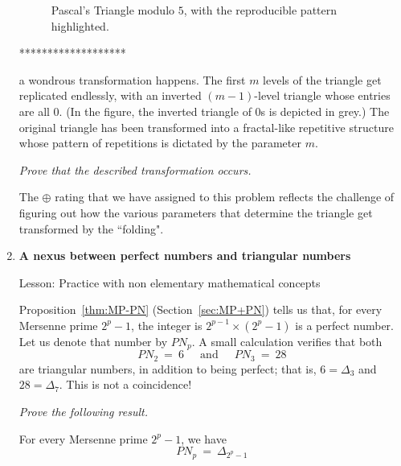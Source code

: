 \begin{enumerate}
{\begin{figure}[ht]
\begin{center}
        \caption{Pascal's Triangle modulo $5$, with the reproducible pattern highlighted.}
        \label{fig:TriangleModulo5shade}
\end{center}
\end{figure}
*******************}
a wondrous transformation happens.  The first $m$ levels of the triangle get replicated endlessly, with an inverted $(m-1)$-level triangle whose entries are all $0$.  (In the figure, the inverted triangle of $0$s is depicted in grey.)  The original triangle has been transformed into a fractal-like repetitive structure whose pattern of repetitions is dictated by the parameter $m$.

\medskip

{\em Prove that the described transformation occurs.}

\smallskip

The $\oplus$ rating that we have assigned to this problem reflects the challenge of figuring out how the various parameters that determine the triangle get transformed by the ``folding".

\medskip\item
{\bf A nexus between perfect numbers and triangular numbers}

{\sc Lesson:} Practice with non elementary mathematical concepts

\smallskip

Proposition~\ref{thm:MP-PN} (Section~\ref{sec:MP+PN}) tells us that, for every Mersenne prime $2^p-1$, the integer is $2^{p-1} \times (2^p-1)$ is a perfect number.  Let us denote that number by $PN_p$.  A small calculation verifies that both
\[ PN_2 \ = \ 6 \ \ \ \ \ \mbox{ and } \ \ \ \ \ PN_3 \ = \ 28 \]
are triangular numbers, in addition to being perfect; that is, $6 =\Delta_3$ and $28=\Delta_7$.  This is not a coincidence!

\smallskip

{\em Prove the following result.}

\begin{prop}
For every Mersenne prime $2^p-1$, we have
\[ PN_p \ = \  \Delta_{2^p-1} \]
\end{prop}


\end{enumerate}
